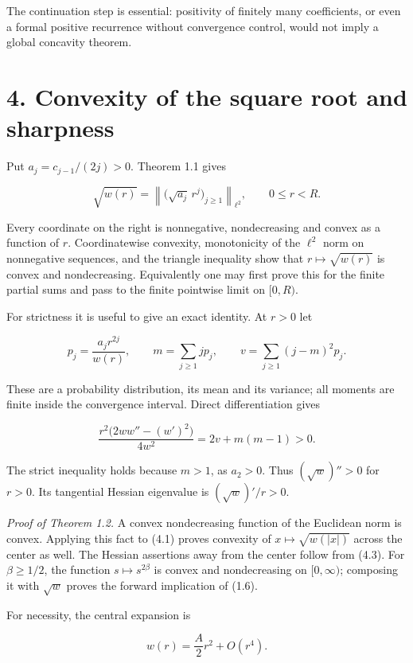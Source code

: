 \documentclass[11pt]{article}
\begin{document}
The continuation step is essential: positivity of finitely many
coefficients, or even a formal positive recurrence without convergence
control, would not imply a global concavity theorem.

\section{4. Convexity of the square root and
sharpness}\label{convexity-of-the-square-root-and-sharpness}

Put \(a_j=c_{j-1}/(2j)>0\). Theorem 1.1 gives

\[
\sqrt{w(r)}=\left\|\bigl(\sqrt{a_j}\,r^j\bigr)_{j\geq1}\right\|_{\ell^2},
\qquad 0\leq r<R.
\tag{4.1}
\]

Every coordinate on the right is nonnegative, nondecreasing and convex
as a function of \(r\). Coordinatewise convexity, monotonicity of the
\(\ell^2\) norm on nonnegative sequences, and the triangle inequality
show that \(r\mapsto\sqrt{w(r)}\) is convex and nondecreasing.
Equivalently one may first prove this for the finite partial sums and
pass to the finite pointwise limit on \([0,R)\).

For strictness it is useful to give an exact identity. At \(r>0\) let

\[
p_j=\frac{a_jr^{2j}}{w(r)},\qquad
m=\sum_{j\geq1}jp_j,\qquad
v=\sum_{j\geq1}(j-m)^2p_j.
\tag{4.2}
\]

These are a probability distribution, its mean and its variance; all
moments are finite inside the convergence interval. Direct
differentiation gives

\[
\frac{r^2\bigl(2ww''-(w')^2\bigr)}{4w^2}
=2v+m(m-1)>0.
\tag{4.3}
\]

The strict inequality holds because \(m>1\), as \(a_2>0\). Thus
\((\sqrt w)''>0\) for \(r>0\). Its tangential Hessian eigenvalue is
\((\sqrt w)'/r>0\).

\emph{Proof of Theorem 1.2.} A convex nondecreasing function of the
Euclidean norm is convex. Applying this fact to (4.1) proves convexity
of \(x\mapsto\sqrt{w(|x|)}\) across the center as well. The Hessian
assertions away from the center follow from (4.3). For \(\beta\geq1/2\),
the function \(s\mapsto s^{2\beta}\) is convex and nondecreasing on
\([0,\infty)\); composing it with \(\sqrt w\) proves the forward
implication of (1.6).

For necessity, the central expansion is

\[
w(r)=\frac A2 r^2+O(r^4).
\tag{4.4}
\]
\end{document}
